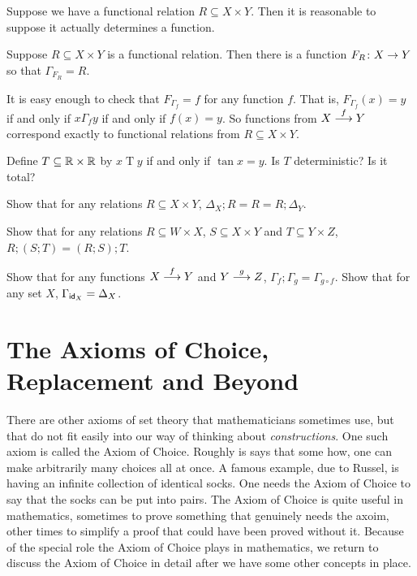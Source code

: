 Suppose we have a functional relation $R\subseteq {X\times Y}$. Then it is reasonable to suppose it actually determines a function.

\begin{principle}\label{princ:graphs}
	Suppose $R\subseteq {X\times Y}$ is a functional relation. 
	Then there is a function $\fromto {F_R}XY$ so that $\Gamma_{F_R} = R$.
\end{principle}

It is easy enough to check that $F_{\Gamma_f} = f$ for any function $f$. 
That is, $F_{\Gamma_f}(x)=y$ if and only if $x\mathrel{\Gamma_f} y$ if and only if $f(x)=y$. 
So functions from $\sfromto fXY$ correspond exactly to functional relations from $R\subseteq X\times Y$.


\begin{exercises}
	\begin{nextexercise}
		\item Define $T\subseteq \RR\times \RR$ by $x\mathrel{T} y$ if and only if $\tan x = y$. Is $T$ deterministic? Is it total?
		\item Show that for any relations $R\subseteq X\times Y$, $\Delta_X;R = R = R;\Delta_Y$.
		\item Show that for any relations $R\subseteq W\times X$, $S\subseteq X\times Y$ and $T\subseteq Y\times Z$, $R;(S;T) = (R;S);T$.
		\item Show that for any functions $\sfromto fXY$ and $\sfromto gYZ$, 
		$\Gamma_f;\Gamma_g = \Gamma_{g\circ f}$.
		Show that for any set $X$, $\Gamma_{\id_X} = \Delta_X$. 
	\end{nextexercise}
\end{exercises}

\section{The Axioms of Choice, Replacement and Beyond}

There are other axioms of set theory that mathematicians sometimes use, but that do not fit easily into our way of thinking about \emph{constructions}. 
One such axiom is called the Axiom of Choice. 
Roughly is says that some how, one can make arbitrarily many choices all at once. 
A famous example, due to Russel, is having an infinite collection of identical socks. 
One needs the Axiom of Choice to say that the socks can be put into pairs. 
The Axiom of Choice is quite useful in mathematics, sometimes to prove something that genuinely needs the axoim, other times to simplify a proof that could have been proved without it. 
Because of the special role the Axiom of Choice plays in mathematics, we return to discuss the Axiom of Choice in detail after we have some other concepts in place.

